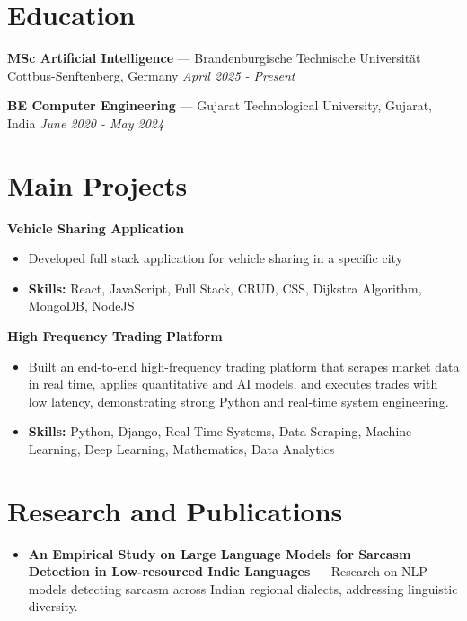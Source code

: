 \documentclass[a4paper,10pt]{article}
\begin{document}
\section*{Education}
\textbf{MSc Artificial Intelligence} — Brandenburgische Technische Universität Cottbus-Senftenberg, Germany \hfill \textit{April 2025 - Present}\par
\vspace{1.5pt}
\textbf{BE Computer Engineering} — Gujarat Technological University, Gujarat, India \hfill \textit{June 2020 - May 2024}\par

\section*{Main Projects}
\textbf{Vehicle Sharing Application}\par
\vspace{1pt}
\begin{itemize}
  \item Developed full stack application for vehicle sharing in a specific city
  \item \textbf{Skills:} React, JavaScript, Full Stack, CRUD, CSS, Dijkstra Algorithm, MongoDB, NodeJS
\end{itemize}
\vspace{3pt}
\textbf{High Frequency Trading Platform}\par
\vspace{1pt}
\begin{itemize}
  \item Built an end-to-end high-frequency trading platform that scrapes market data in real time, applies quantitative and AI models, and executes trades with low latency, demonstrating strong Python and real-time system engineering.
  \item \textbf{Skills:} Python, Django, Real-Time Systems, Data Scraping, Machine Learning, Deep Learning, Mathematics, Data Analytics
\end{itemize}

\section*{Research and Publications}
\begin{itemize}
\item \textbf{An Empirical Study on Large Language Models for Sarcasm Detection in Low-resourced Indic Languages} — Research on NLP models detecting sarcasm across Indian regional dialects, addressing linguistic diversity.
\end{itemize}
\end{document}
